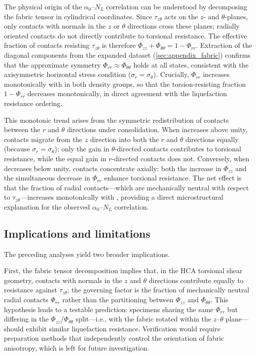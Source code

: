 The physical origin of the $\alpha_0$--$N_L$ correlation can be understood by decomposing the fabric tensor in cylindrical coordinates. Since $\tau_{z\theta}$ acts on the $z$- and $\theta$-planes, only contacts with normals in the $z$ or $\theta$ directions cross these planes; radially oriented contacts do not directly contribute to torsional resistance. The effective fraction of contacts resisting $\tau_{z\theta}$ is therefore $\Phi_{zz} + \Phi_{\theta\theta} = 1 - \Phi_{rr}$. Extraction of the diagonal components from the expanded dataset (\cref{sec:appendix_fabric}) confirms that the approximate symmetry $\Phi_{rr} \approx \Phi_{\theta\theta}$ holds at all \Kzero{} states, consistent with the axisymmetric horizontal stress condition ($\sigma_r = \sigma_\theta$). Crucially, $\Phi_{rr}$ increases monotonically with \Kzero{} in both density groups, so that the torsion-resisting fraction $1 - \Phi_{rr}$ decreases monotonically, in direct agreement with the liquefaction resistance ordering.

This monotonic trend arises from the symmetric redistribution of contacts between the $r$ and $\theta$ directions under \Kzero{} consolidation. When \Kzero{} increases above unity, contacts migrate from the $z$ direction into both the $r$ and $\theta$ directions equally (because $\sigma_r = \sigma_\theta$); only the gain in $\theta$-directed contacts contributes to torsional resistance, while the equal gain in $r$-directed contacts does not. Conversely, when \Kzero{} decreases below unity, contacts concentrate axially: both the increase in $\Phi_{zz}$ and the simultaneous decrease in $\Phi_{rr}$ enhance torsional resistance. The net effect is that the fraction of radial contacts---which are mechanically neutral with respect to $\tau_{z\theta}$---increases monotonically with \Kzero{}, providing a direct microstructural explanation for the observed $\alpha_0$--$N_L$ correlation.

\subsection{Implications and limitations}
\label{subsec:limitations}

The preceding analyses yield two broader implications.

First, the fabric tensor decomposition implies that, in the HCA torsional shear geometry, contacts with normals in the $z$ and $\theta$ directions contribute equally to resistance against $\tau_{z\theta}$; the governing factor is the fraction of mechanically neutral radial contacts $\Phi_{rr}$ rather than the partitioning between $\Phi_{zz}$ and $\Phi_{\theta\theta}$. This hypothesis leads to a testable prediction: specimens sharing the same $\Phi_{rr}$ but differing in the $\Phi_{zz}$/$\Phi_{\theta\theta}$ split---i.e., with the fabric rotated within the $z$--$\theta$ plane---should exhibit similar liquefaction resistance. Verification would require preparation methods that independently control the orientation of fabric anisotropy, which is left for future investigation.

